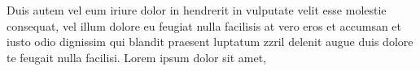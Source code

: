 Duis autem vel eum iriure dolor in hendrerit in vulputate velit esse molestie consequat, vel illum dolore eu feugiat nulla facilisis at vero eros et accumsan et iusto odio dignissim qui blandit praesent luptatum zzril delenit augue duis dolore te feugait nulla facilisi. Lorem ipsum dolor sit amet,

\newpage